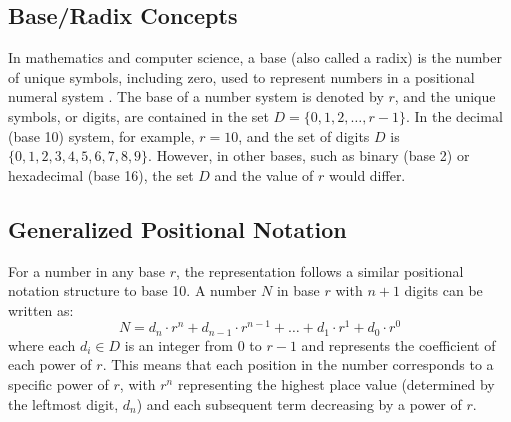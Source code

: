 \subsection{Base/Radix Concepts}
In mathematics and computer science, a base (also called a radix) is the number of unique symbols, including zero, used to represent numbers in a positional numeral system \cite{knuth1997,rosen2018}. The base of a number system is denoted by \( r \), and the unique symbols, or digits, are contained in the set \( D = \{0, 1, 2, \ldots, r-1\} \). In the decimal (base 10) system, for example, \( r = 10 \), and the set of digits \( D \) is \( \{0, 1, 2, 3, 4, 5, 6, 7, 8, 9\} \). However, in other bases, such as binary (base 2) or hexadecimal (base 16), the set \( D \) and the value of \( r \) would differ.

\subsection{Generalized Positional Notation}

For a number in any base \( r \), the representation follows a similar positional notation structure to base 10. A number \( N \) in base \( r \) with \( n+1 \) digits can be written as:
\[
N = d_n \cdot r^n + d_{n-1} \cdot r^{n-1} + \ldots + d_1 \cdot r^1 + d_0 \cdot r^0
\]
where each \( d_i \in D \) is an integer from \( 0 \) to \( r-1 \) and represents the coefficient of each power of \( r \). This means that each position in the number corresponds to a specific power of \( r \), with \( r^n \) representing the highest place value (determined by the leftmost digit, \( d_n \)) and each subsequent term decreasing by a power of \( r \).

